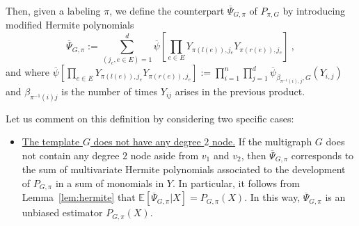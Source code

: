 \documentclass{article}
\begin{document}
Then, given a labeling $\pi$, we define the counterpart $\overline{\Psi}_{G,\pi}$ of $P_{\pi,G}$ by introducing modified Hermite polynomials
\begin{equation}\label{eq:Hermite_graph}
 \overline{\Psi}_{G,\pi} := \sum_{(j_e, e\in E) =1}^d \overline{\psi}\left[\prod_{e\in E} Y_{\pi(l(e)),j_e}Y_{\pi(r(e)),j_e}  \right]\ , 
\end{equation}
and where $\overline{\psi}\left[\prod_{e\in E}  Y_{\pi(l(e)),j_e}Y_{\pi(r(e)),j_e}  \right]:= \prod_{i=1}^n\prod_{j=1}^d \overline{\psi}_{\beta_{\pi^{-1}(i),j},G}(Y_{i,j})$ and $\beta_{\pi^{-1}(i)j}$ is the number of times $Y_{ij}$ arises in the previous product. 

Let us comment on this definition by considering two specific cases:
\begin{itemize}
    \item 
\underline{The template $G$ does not have any  degree $2$ node.} If the multigraph $G$ does not contain any degree $2$ node aside from $v_1$ and $v_2$, then $\overline{\Psi}_{G,\pi}$ corresponds to the sum of multivariate Hermite polynomials associated to the development of $P_{G,\pi}$ in a sum of monomials in $Y$. In particular, it follows from Lemma~\ref{lem:hermite} that $\mathbb{E}[\overline{\Psi}_{G,\pi}|X]= P_{G,\pi}(X)$. In this way, $\overline{\Psi}_{G,\pi}$ is an unbiased estimator $P_{G,\pi}(X)$.






\end{itemize}
\end{document}
